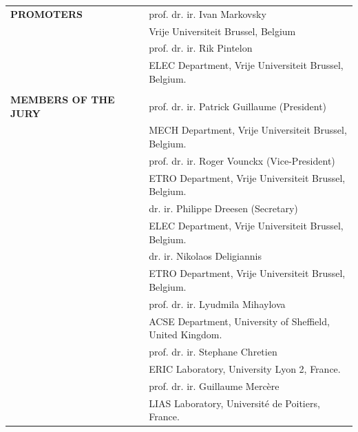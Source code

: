 \documentclass[english, british, BCOR=5mm, DIV=12, fontsize=10pt]{scrbook}
\begin{document}
{	\begin{tabular}{@{}lll@{}}
	\textbf{\small PROMOTERS}		& &	{\small prof. dr. ir. Ivan Markovsky}				\\
				& &		{\footnotesize{}Vrije Universiteit Brussel, Belgium}\\[0.3em]
				& &	\small prof. dr. ir. Rik Pintelon				\\
				& &		{\footnotesize{}ELEC Department, Vrije Universiteit Brussel, Belgium.}	\\[0.3em]
				\\
	\textbf{\small MEMBERS OF THE JURY}	&	&\small prof. dr. ir. Patrick Guillaume (President)		\\
				&	&{\footnotesize{}MECH Department, Vrije Universiteit Brussel, Belgium.}	\\[0.3em]
				&	&\small prof. dr. ir. Roger Vounckx (Vice-President)				\\
				&	&{\footnotesize{}ETRO Department, Vrije Universiteit Brussel, Belgium.}	\\[0.3em]
				&	&\small dr. ir. Philippe Dreesen (Secretary)					\\
				&	&{\footnotesize{}ELEC Department, Vrije Universiteit Brussel, Belgium.}				\\[0.3em]
				&	&\small dr. ir. Nikolaos Deligiannis \\
				&	&{\footnotesize{}ETRO Department, Vrije Universiteit Brussel, Belgium.} 			\\[0.3em]
				&	&\small prof. dr. ir. Lyudmila Mihaylova 		\\
				&	&{\footnotesize{}ACSE Department, University of Sheffield, United Kingdom.} \\
				&	&\small prof. dr. ir. Stephane Chretien  		\\
				&	&{\footnotesize{}ERIC Laboratory, University Lyon 2, France.} \\
				&	&\small prof. dr. ir. Guillaume  Merc\`ere 		\\
				&	&{\footnotesize{}LIAS Laboratory, Universit\'e de Poitiers, France.} \\
\end{tabular}

}
\end{document}
